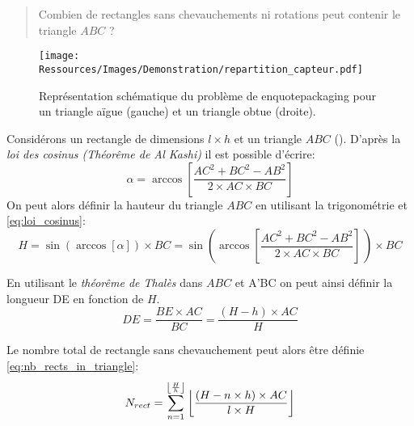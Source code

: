 

\blockquote{Combien de rectangles sans chevauchements ni rotations peut contenir le triangle $ABC$ ?}

\begin{figure}
    \centering
    \texttt{[image: Ressources/Images/Demonstration/repartition\_capteur.pdf]}
    \caption{Représentation schématique du problème de enquote{packaging} pour
             un triangle aïgue (gauche) et un triangle obtue (droite).
             \label{fig:rects_in_triangle}}
\end{figure}

Considérons un rectangle de dimensions $l \times h$ et un triangle $ABC$ ().
D’après la \textit{loi des cosinus (Théorême de Al Kashi)} il est possible d’écrire:
\begin{equation}
        \alpha = \arccos \left[\frac{AC^{2} + BC^{2} - AB^{2}}{2 \times AC \times BC}\right]
    \label{eq:loi_cosinus}
\end{equation}
\noindent On peut alors définir la hauteur du triangle $ABC$ en utilisant la trigonométrie et
\eqref{eq:loi_cosinus}:
\begin{equation}
        H = \sin (\arccos[\alpha]) \times BC%
          =\sin \left(\arccos \left[\frac{AC^{2} + BC^{2} - AB^{2}}{2 \times AC \times BC}\right]\,\right) \times BC
    \label{fig:height_triangle}
\end{equation}

\noindent En utilisant le \textit{théorême de Thalès} dans $ABC$ et A’BC on peut ainsi définir la longueur DE
en fonction de $H$.
\begin{equation}
    DE = \frac{BE \times AC}{BC} = \frac{(H - h) \times AC}{H}
\end{equation}

\noindent Le nombre total de rectangle sans chevauchement peut alors être définie \eqref{eq:nb_rects_in_triangle}:
\begin{equation}
    N_{rect} = \sum_{n = 1}^{\floor*{\frac{H}{h}}} \, \floor*{\frac{(H - n \times h) \times AC}{l \times H}}
    \label{eq:nb_rects_in_triangle}
\end{equation}
